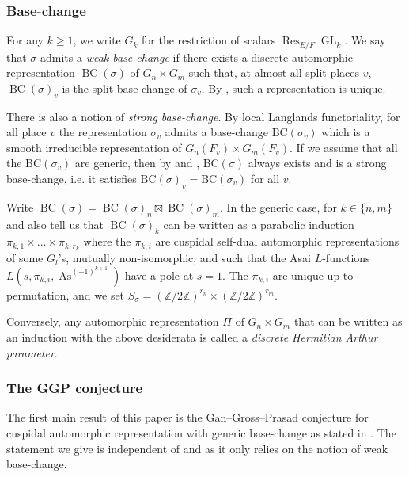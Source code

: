 \documentclass[letterpaper,11pt]{amsart}
\newcommand{\Z}{\mathbb{Z}}
\newcommand{\<}{\negthickspace}
\DeclareMathOperator{\GL}{GL}
\DeclareMathOperator{\Res}{Res}
\DeclareMathOperator{\BC}{BC}
\DeclareMathOperator{\As}{As}
\theoremstyle{definition}
\theoremstyle{plain}
\theoremstyle{remark}
\numberwithin{equation}{section}
\begin{document}
\subsubsection{Base-change}
For any $k \geq 1$, we write $G_k$ for the restriction of scalars $\Res_{E/F} \GL_k$. We say that $\sigma$ admits a \emph{weak base-change} if there exists a discrete automorphic representation $\BC(\sigma)$ of $G_n \times G_m$ such that, at almost all split places $v$, $\BC(\sigma)_v$ is the split base change of $\sigma_v$. By \cite{Ram}, such a representation is unique.

There is also a notion of \emph{strong base-change}. By local Langlands functoriality, for all place $v$ the representation $\sigma_v$ admits a base-change $\mathrm{BC}(\sigma_v)$ which is a smooth irreducible representation of $G_n(F_v) \times G_m(F_v)$. If we assume that all the $\mathrm{BC}(\sigma_v)$ are generic, then by \cite{Mok} and \cite{KMSW}, $\mathrm{BC}(\sigma)$ always exists and is a strong base-change, i.e. it satisfies $\mathrm{BC}(\sigma)_v=\mathrm{BC}(\sigma_v)$ for all $v$.

Write $\BC(\sigma)=\BC(\sigma)_n \boxtimes \BC(\sigma)_m$. In the generic case, for $k \in \{n,m\}$ \cite{Mok} and \cite{KMSW} also tell us that $\BC(\sigma)_k$  can be written as a parabolic induction $\pi_{k,1} \times \hdots \times \pi_{k,r_k}$ where the $\pi_{k,i}$ are cuspidal self-dual automorphic representations of some $G_l$'s, mutually non-isomorphic, and such that the Asai $L$-functions $L(s,\pi_{k,i},\As^{(-1)^{k+1}})$ have a pole at $s=1$. The $\pi_{k,i}$ are unique up to permutation, and we set $ S_\sigma=(\Z / 2 \Z)^{r_n} \times (\Z / 2 \Z)^{r_m}$.

Conversely, any automorphic representation $\Pi$ of $G_n \times G_m$ that can be written as an induction with the above desiderata is called a \emph{discrete Hermitian Arthur parameter}. 

\subsubsection{The GGP conjecture}

The first main result of this paper is the Gan--Gross--Prasad conjecture for cuspidal automorphic representation with generic base-change as stated in \cite{GGP}. The statement we give is independent of \cite{Mok} and \cite{KMSW} as it only relies on the notion of weak base-change.
\end{document}

